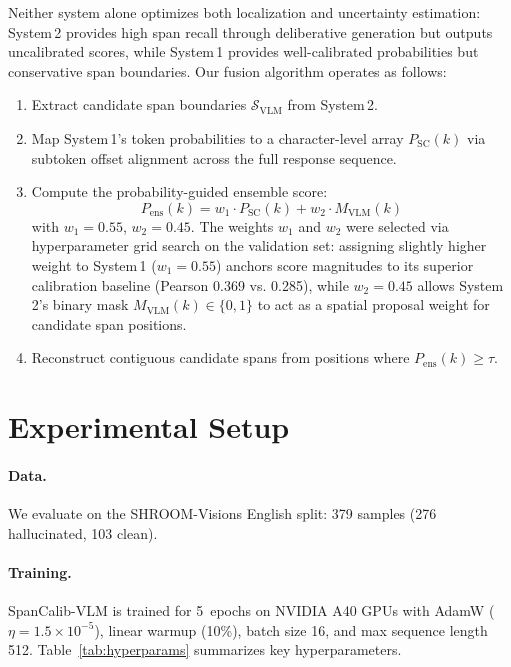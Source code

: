 \documentclass[11pt]{article}
\begin{document}
Neither system alone optimizes both localization and uncertainty estimation: System\,2 provides high span recall through deliberative generation but outputs uncalibrated scores, while System\,1 provides well-calibrated probabilities but conservative span boundaries. Our fusion algorithm operates as follows:
\begin{enumerate}[noitemsep,leftmargin=*]
    \item Extract candidate span boundaries $\mathcal{S}_{\text{VLM}}$ from System\,2.
    \item Map System\,1's token probabilities to a character-level array $P_{\text{SC}}(k)$ via subtoken offset alignment across the full response sequence.
    \item Compute the probability-guided ensemble score:
    \begin{equation}
        P_{\text{ens}}(k) = w_1 \cdot P_{\text{SC}}(k) + w_2 \cdot M_{\text{VLM}}(k)
    \end{equation}
    with $w_1\!=\!0.55$, $w_2\!=\!0.45$. The weights $w_1$ and $w_2$ were selected via hyperparameter grid search on the validation set: assigning slightly higher weight to System\,1 ($w_1\!=\!0.55$) anchors score magnitudes to its superior calibration baseline (Pearson 0.369 vs. 0.285), while $w_2\!=\!0.45$ allows System\,2's binary mask $M_{\text{VLM}}(k) \in \{0,1\}$ to act as a spatial proposal weight for candidate span positions.
    \item Reconstruct contiguous candidate spans from positions where $P_{\text{ens}}(k) \ge \tau$.
\end{enumerate}

\section{Experimental Setup}

\paragraph{Data.}
We evaluate on the SHROOM-Visions English split: 379 samples (276 hallucinated, 103 clean).

\paragraph{Training.}
SpanCalib-VLM is trained for 5~epochs on NVIDIA A40 GPUs with AdamW ($\eta\!=\!1.5{\times}10^{-5}$), linear warmup (10\%), batch size 16, and max sequence length 512. Table~\ref{tab:hyperparams} summarizes key hyperparameters.
\end{document}
